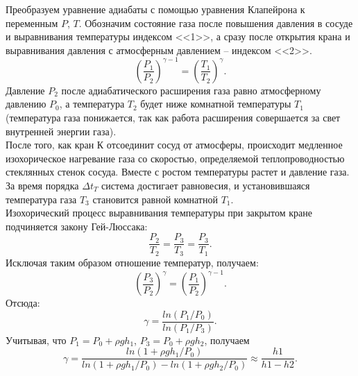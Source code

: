 \documentclass[a4paper,11pt]{article}
\begin{document}
Преобразуем уравнение адиабаты с помощью уравнения Клапейрона к переменным $P$, $T$. Обозначим состояние газа после повышения давления в сосуде и выравнивания температуры индексом <<1>>, а сразу после открытия крана и выравнивания давления с атмосферным давлением -- индексом <<2>>.\\
\begin{equation}    \label{eq1}
  \left(\frac{P_{1}}{P_{2}}\right)^{\gamma - 1} = \left(\frac{T_{1}}{T_{2}}\right)^{\gamma}.
\end{equation}
Давление $P_{2}$ после адиабатического расширения газа равно атмосферному давлению $P_{0}$, а температура $T_{2}$ будет ниже комнатной температуры $T_{1}$ (температура газа понижается, так как работа расширения совершается за свет внутренней энергии газа).\\
После того, как кран К отсоединит сосуд от атмосферы, происходит медленное изохорическое нагревание газа со скоростью, определяемой теплопроводностью стеклянных стенок сосуда. Вместе с ростом температуры растет и давление газа. За время порядка $\Delta t_{T}$ система достигает равновесия, и установившаяся температура газа $T_{3}$ становится равной комнатной $T_{1}$.\\
Изохорический процесс выравнивания температуры при закрытом кране подчиняется закону Гей-Люссака:
\begin{equation}    \label{eq2}
  \frac{P_{2}}{T_{2}} = \frac{P_{3}}{T_{3}} = \frac{P_{3}}{T_{1}}.
\end{equation}
Исключая таким образом отношение температур, получаем:
\begin{equation}    \label{eq3}
  \left(\frac{P_{3}}{P_{2}}\right)^{\gamma} = \left(\frac{P_{1}}{P_{2}}\right)^{\gamma - 1}.
\end{equation}
Отсюда:
\begin{equation}    \label{eq4}
  \gamma = \frac{ln(P_{1}/P_{0})}{ln(P_{1}/P_{3})}.
\end{equation}
Учитывая, что $P_{1} = P_{0} + \rho gh_{1}$, $P_{3} = P_{0} + \rho gh_{2}$, получаем
\begin{equation}    \label{eq5}
  \gamma = \frac{ln(1 + \rho g h_{1}/P_{0})}{ln(1 + \rho g h_{1}/P_{0}) - ln(1 + \rho g h_{2}/P_{0})} \approx \frac{h1}{h1-h2}.
\end{equation}
\end{document}
